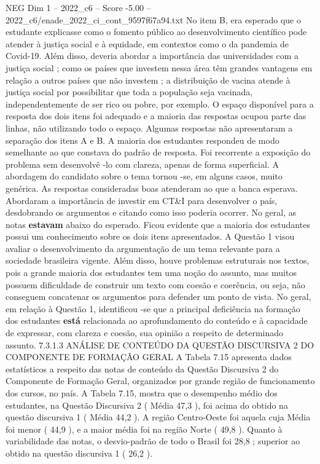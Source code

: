 \begin{textsample}{NEG Dim 1 – 2022\_c6 – Score -5.00 – 2022\_c6/enade\_2022\_ci\_cont\_9597f67a94.txt}
No item B, era esperado que o estudante explicasse como o fomento público ao desenvolvimento científico pode atender à justiça social e à equidade, em contextos como o da pandemia de Covid-19.
Além disso, deveria abordar a importância das universidades com a justiça social ; como os países que investem nessa área têm grandes vantagens em relação a outros países que não investem ; a distribuição de vacina atende à justiça social por possibilitar que toda a população seja vacinada, independentemente de ser rico ou pobre, por exemplo.
O espaço disponível para a resposta dos dois itens foi adequado e a maioria das respostas ocupou parte das linhas, não utilizando todo o espaço.
Algumas respostas não apresentaram a separação dos itens A e B.
A maioria dos estudantes respondeu de modo semelhante ao que constava do padrão de resposta.
Foi recorrente a exposição do problema sem desenvolvê -lo com clareza, apenas de forma superficial.
A abordagem do candidato sobre o tema tornou -se, em alguns casos, muito genérica.
As respostas consideradas boas atenderam ao que a banca esperava.
Abordaram a importância de investir em CT\&I para desenvolver o país, desdobrando os argumentos e citando como isso poderia ocorrer.
No geral, as notas \textbf{estavam} abaixo do esperado.
Ficou evidente que a maioria dos estudantes possui um conhecimento sobre os dois itens apresentados.
A Questão 1 visou avaliar o desenvolvimento da argumentação de um tema relevante para a sociedade brasileira vigente.
Além disso, houve problemas estruturais nos textos, pois a grande maioria dos estudantes tem uma noção do assunto, mas muitos possuem dificuldade de construir um texto com coesão e coerência, ou seja, não conseguem concatenar os argumentos para defender um ponto de vista.
No geral, em relação à Questão 1, identificou -se que a principal deficiência na formação dos estudantes \textbf{está} relacionada ao aprofundamento do conteúdo e à capacidade de expressar, com clareza e coesão, sua opinião a respeito de determinado assunto. 7.3.1.3 ANÁLISE DE CONTEÚDO DA QUESTÃO DISCURSIVA 2 DO COMPONENTE DE FORMAÇÃO GERAL A Tabela 7.15 apresenta dados estatísticos a respeito das notas de conteúdo da Questão Discursiva 2 do Componente de Formação Geral, organizados por grande região de funcionamento dos cursos, no país.
A Tabela 7.15, mostra que o desempenho médio dos estudantes, na Questão Discursiva 2 ( Média 47,3 ), foi acima do obtido na questão discursiva 1 ( Média 44,2 ).
A região Centro-Oeste foi aquela cuja Média foi menor ( 44,9 ), e a maior média foi na região Norte ( 49,8 ).
Quanto à variabilidade das notas, o desvio-padrão de todo o Brasil foi 28,8 ; superior ao obtido na questão discursiva 1 ( 26,2 ).

\end{textsample}
